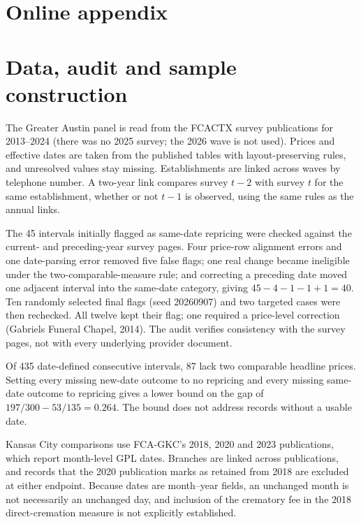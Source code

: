 \section*{Online appendix}
\setcounter{table}{0}
\renewcommand{\thetable}{A\arabic{table}}
\setcounter{section}{0}
\renewcommand{\thesection}{A.\arabic{section}}

\section{Data, audit and sample construction}
The Greater Austin panel is read from the FCACTX survey publications for 2013--2024 (there was no 2025 survey; the 2026 wave is not used). Prices and effective dates are taken from the published tables with layout-preserving rules, and unresolved values stay missing. Establishments are linked across waves by telephone number. A two-year link compares survey $t-2$ with survey $t$ for the same establishment, whether or not $t-1$ is observed, using the same rules as the annual links.

The 45 intervals initially flagged as same-date repricing were checked against the current- and preceding-year survey pages. Four price-row alignment errors and one date-parsing error removed five false flags; one real change became ineligible under the two-comparable-measure rule; and correcting a preceding date moved one adjacent interval into the same-date category, giving $45-4-1-1+1=40$. Ten randomly selected final flags (seed 20260907) and two targeted cases were then rechecked. All twelve kept their flag; one required a price-level correction (Gabriels Funeral Chapel, 2014). The audit verifies consistency with the survey pages, not with every underlying provider document.

Of 435 date-defined consecutive intervals, 87 lack two comparable headline prices. Setting every missing new-date outcome to no repricing and every missing same-date outcome to repricing gives a lower bound on the gap of $197/300-53/135=0.264$. The bound does not address records without a usable date.

Kansas City comparisons use FCA-GKC's 2018, 2020 and 2023 publications, which report month-level GPL dates. Branches are linked across publications, and records that the 2020 publication marks as retained from 2018 are excluded at either endpoint. Because dates are month--year fields, an unchanged month is not necessarily an unchanged day, and inclusion of the crematory fee in the 2018 direct-cremation measure is not explicitly established.

